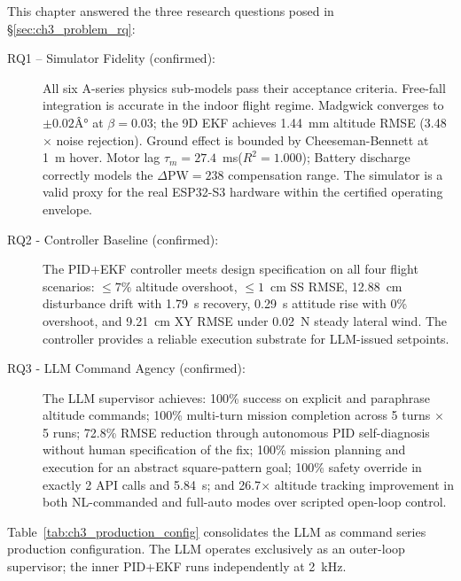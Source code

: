 This chapter answered the three research questions posed in
\S\ref{sec:ch3_problem_rq}:

\begin{description}
  \item[RQ1 -- Simulator Fidelity (confirmed):]
    All six A-series physics sub-models pass their acceptance criteria.
    Free-fall integration is accurate in the indoor flight regime.
    Madgwick converges to $\pm 0.02Â°$ at $\beta = 0.03$; the 9D EKF achieves 1.44~mm altitude RMSE (3.48$\times$ noise rejection).
    Ground effect is bounded by Cheeseman-Bennett at 1~m hover.
    Motor lag $\tau_m = 27.4$~ms($R^2 = 1.000$); Battery discharge correctly models the $\Delta\text{PW}=238$ compensation range. 
    The simulator is a valid proxy for the real ESP32-S3 hardware within the certified operating envelope.

  \item[RQ2 - Controller Baseline (confirmed):]
    The PID+EKF controller meets design specification on all four flight scenarios: $\leq 7\%$ altitude overshoot, $\leq 1$~cm SS RMSE, 12.88~cm disturbance drift with 1.79~s recovery, 0.29~s attitude rise with 0\% overshoot, and 9.21~cm XY RMSE under 0.02~N steady lateral wind.
    The controller provides a reliable execution substrate for LLM-issued setpoints.

  \item[RQ3 - LLM Command Agency (confirmed):]
    The LLM supervisor achieves: 100\% success on explicit and paraphrase altitude commands; 100\% multi-turn mission completion across
    5 turns $\times$ 5 runs; 72.8\% RMSE reduction through autonomous PID self-diagnosis without human specification of the fix; 100\% mission planning and execution for an abstract square-pattern goal; 100\% safety override in exactly 2 API calls and 5.84~s; and 26.7$\times$ altitude tracking improvement in both NL-commanded and
    full-auto modes over scripted open-loop control.
\end{description}

Table~\ref{tab:ch3_production_config} consolidates the LLM as command series production configuration.
The LLM operates exclusively as an outer-loop supervisor; the inner PID+EKF runs independently at 2~kHz.

